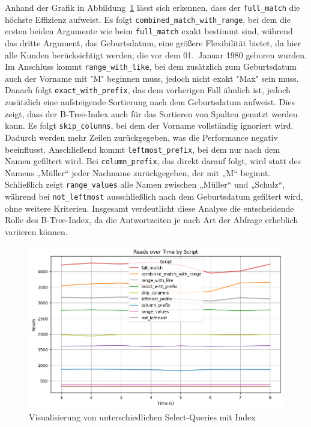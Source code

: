 Anhand der Grafik in Abbildung~\ref{fig:indexing-b-tree-query-reads} lässt sich erkennen, dass der \texttt{full\_match} die höchste Effizienz aufweist.
Es folgt \texttt{combined\_match\_with\_range}, bei dem die ersten beiden Argumente wie beim \texttt{full\_match} exakt bestimmt sind, während das dritte Argument, das Geburtsdatum, eine größere Flexibilität bietet, da hier alle Kunden berücksichtigt werden, die vor dem 01.\ Januar 1980 geboren wurden.
Im Anschluss kommt \texttt{range\_with\_like}, bei dem zusätzlich zum Geburtsdatum auch der Vorname mit "M" beginnen muss, jedoch nicht exakt "Max" sein muss.
Danach folgt \texttt{exact\_with\_prefix}, das dem vorherigen Fall ähnlich ist, jedoch zusätzlich eine aufsteigende Sortierung nach dem Geburtsdatum aufweist.
Dies zeigt, dass der B-Tree-Index auch für das Sortieren von Spalten genutzt werden kann.
Es folgt \texttt{skip\_columns}, bei dem der Vorname vollständig ignoriert wird.
Dadurch werden mehr Zeilen zurückgegeben, was die Performance negativ beeinflusst.
Anschließend kommt \texttt{leftmost\_prefix}, bei dem nur nach dem Namen gefiltert wird.
Bei \texttt{column\_prefix}, das direkt darauf folgt, wird statt des Namens „Müller“ jeder Nachname zurückgegeben, der mit „M“ beginnt.
Schließlich zeigt \texttt{range\_values} alle Namen zwischen „Müller“ und „Schulz“, während bei \texttt{not\_leftmost} ausschließlich nach dem Geburtsdatum gefiltert wird, ohne weitere Kriterien.
Insgesamt verdeutlicht diese Analyse die entscheidende Rolle des B-Tree-Index, da die Antwortzeiten je nach Art der Abfrage erheblich variieren können.

\begin{figure}[H]
    \centering
    \includegraphics[width=.7\textwidth]{PNGs/Script/Index/B_Tree/b-tree-query-differences/Reads}
    \caption[B-Tree-Indexing: Unterschiedliche Selects mit Index]{Visualisierung von unterschiedlichen Select-Queries mit Index}
    \label{fig:indexing-b-tree-query-reads}
\end{figure}
\vspace{-15pt}

